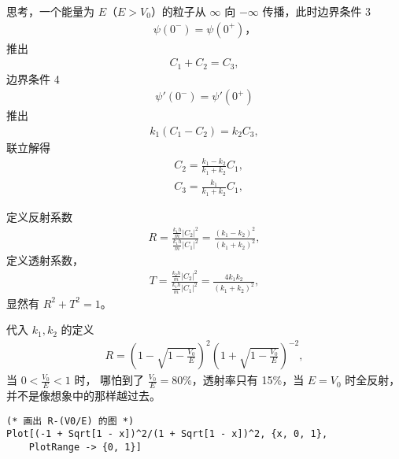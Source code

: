 思考，一个能量为 $E$（$E>V_0$）的粒子从 $\infty$ 向 $-\infty$ 传播，此时边界条件 3
\begin{eqnarray}
    \psi(0^-) = \psi(0^+)，
\end{eqnarray}
推出
\begin{eqnarray}
    C_1 + C_2 = C_3,
\end{eqnarray}
边界条件 4
\begin{eqnarray}
    \psi'(0^-) = \psi'(0^+)
\end{eqnarray}
推出
\begin{eqnarray}
    k_1 (C_1 - C_2) = k_2 C_3,
\end{eqnarray}
联立解得
\begin{align}
    & C_2 = \frac{k_1 - k_2} {k_1 + k_2} C_1, \\
    & C_3 = \frac{k_1}{k_1 + k_2} C_1,
\end{align}

定义反射系数
\begin{eqnarray}
    R = \frac{ \displaystyle \frac{k_1 h}m |C_2|^2 } { \displaystyle \frac{k_1 h}m |C_1|^2 } = \frac{(k_1 - k_2)^2} {(k_1 + k_2)^2}, 
\end{eqnarray}
定义透射系数，
\begin{eqnarray}
    T = \frac{ \displaystyle \frac{k_2 h}m |C_2|^2 } { \displaystyle \frac{k_1 h}m |C_1|^2 } = \frac{4k_1k_2} {(k_1 + k_2)^2}, 
\end{eqnarray}
显然有 $R^2 + T^2 = 1$。

代入 $k_1, k_2$ 的定义
\begin{eqnarray}
    R = \left( 1 - \sqrt{1 - \frac{V_0}E}\right)^2 
    \left( 1 + \sqrt{1 - \frac{V_0}E}\right)^{-2},
\end{eqnarray}
当 $0 < \frac{V_0}{E} < 1$ 时，
哪怕到了 $\frac{V_0}E = 80\%$，透射率只有 15\%，当 $E = V_0$ 时全反射，并不是像想象中的那样越过去。
\begin{lstlisting}
(* 画出 R-(V0/E) 的图 *)
Plot[(-1 + Sqrt[1 - x])^2/(1 + Sqrt[1 - x])^2, {x, 0, 1}, 
    PlotRange -> {0, 1}]
\end{lstlisting}


